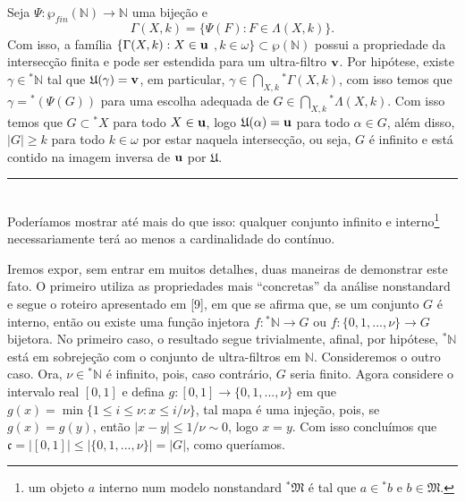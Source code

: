 \documentclass[11pt,a4paper]{article}
\def\eop{\hfill\rule{2.5mm}{2.5mm} \\ }
\theoremstyle{definition}
\begin{document}
Seja $\Psi :\wp_{fin} (\mathbb{N}) \rightarrow \mathbb{N}$ uma bijeção e $$\Gamma (X,k)= \{ \Psi (F): F\in \Lambda (X,k)\}.$$ Com isso, a família $\{ \Gamma (X,k): X\in \bf{u}$ $,k\in\omega  \}\subset \wp(\mathbb{N})$ possui a propriedade da intersecção finita e pode ser estendida para um ultra-filtro $\bf{v}$. Por hipótese, existe $\gamma \in {^*\mathbb{N}}$ tal que $\mathfrak{U}(\gamma)=\bf{v}$, em particular, $\gamma \in \bigcap _{X,k} {^* \Gamma (X,k)}$, com isso temos que $\gamma = {^*(\Psi (G))}$ para uma escolha adequada de $G\in \bigcap _{X,k} {^* \Lambda (X,k)}$. Com isso temos que $G\subset {^* X}$ para todo $X\in \bf{u}$, logo $\mathfrak{U}(\alpha)=\bf{u}$ para todo $\alpha \in G$, além disso, $|G|\geq k$ para todo $k\in \omega$ por estar naquela intersecção, ou seja, $G$ é infinito e está contido na imagem inversa de $\bf{u}$ por $\mathfrak{U}$. \eop


Poderíamos mostrar até mais do que isso: qualquer conjunto infinito e interno\footnote{um objeto $a$ interno num modelo nonstandard $^* \mathfrak{M}$ é tal que $a\in {^* b}$ e $b\in \mathfrak{M}$.} necessariamente terá ao menos a cardinalidade do contínuo. 

Iremos expor, sem entrar em muitos detalhes, duas maneiras de demonstrar este fato. O primeiro utiliza as propriedades mais ``concretas'' da análise nonstandard e segue o roteiro  apresentado em [9], em que se afirma que, se um conjunto $G$ é interno, então ou existe uma função injetora $f:{^*\mathbb{N}}\rightarrow G$ ou $f:\{ 0,1,...,\nu \}\rightarrow G$ bijetora. No primeiro caso, o resultado segue trivialmente, afinal, por hipótese, $^*\mathbb{N}$ está em sobrejeção com o conjunto de ultra-filtros em $\mathbb{N}$. Consideremos o outro caso. Ora, $\nu \in {^* \mathbb{N}}$ é infinito, pois, caso contrário, $G$ seria finito. Agora considere o intervalo real $[0,1]$ e defina $g:[0,1]\rightarrow \{ 0,1,...,\nu \}$ em que $g(x)=\min \{ 1\leq i \leq \nu : x\leq i/\nu \}$, tal mapa é uma injeção, pois, se $g(x)=g(y)$, então $|x-y|\leq 1/\nu \sim 0$, logo $x=y$. Com isso concluímos que $\mathfrak{c}=|[0,1]|\leq |\{ 0,1,...,\nu \}| = |G|$, como queríamos. 
\end{document}
